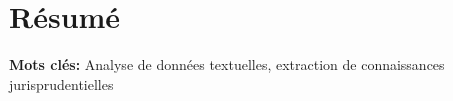 \chapter*{Résumé}

\textbf{Mots clés:} Analyse de données textuelles, extraction de connaissances jurisprudentielles

